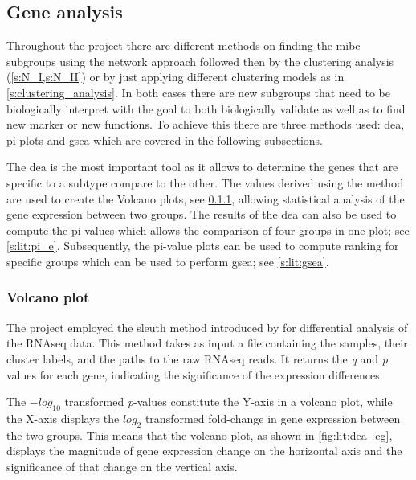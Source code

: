 \subsection{Gene analysis} \label{s:lit:gene_analysis}


Throughout the project there are different methods on finding the \acrfull{mibc} subgroups using the network approach followed then by the clustering analysis (\cref{s:N_I,s:N_II}) or by just applying different clustering models as in \cref{s:clustering_analysis}. In both cases there are new subgroups that need to be biologically interpret with the goal to both biologically validate as well as to find new marker or new functions. To achieve this there are three methods used: \acrfull{dea}, pi-plots and \acrfull{gsea} which are covered in the following subsections. 

The \acrshort{dea} is the most important tool as it allows to determine the genes that are specific to a subtype compare to the other. The values derived using the method are used to create the Volcano plots, see \cref{s:lit:dea}, allowing statistical analysis of the gene expression between two groups. The results of the \acrshort{dea} can also be used to compute the pi-values \citet{Xiao2014-zn} which allows the comparison of four groups in one plot; see \cref{s:lit:pi_e}. Subsequently, the pi-value plots can be used to compute ranking for specific groups which can be used to perform \acrlong{gsea}; see \cref{s:lit:gsea}.


\subsubsection{Volcano plot} \label{s:lit:dea}


The project employed the sleuth method introduced by \citet{Pimentel2017-xp} for differential analysis of the RNAseq data. This method takes as input a file containing the samples, their cluster labels, and the paths to the raw RNAseq reads. It returns the \textit{q} and \textit{p} values for each gene, indicating the significance of the expression differences.

The $-log_{10}$ transformed \textit{p}-values constitute the Y-axis in a volcano plot, while the X-axis displays the $log_{2}$ transformed fold-change in gene expression between the two groups. This means that the volcano plot, as shown in \cref{fig:lit:dea_eg}, displays the magnitude of gene expression change on the horizontal axis and the significance of that change on the vertical axis.


